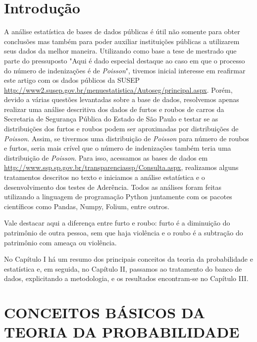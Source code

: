 \documentclass[
	12pt,
	openright,			%
	twoside,			%
	a4paper,			%
	chapter=TITLE,		%
	section=TITLE,		%
	subsection=TITLE,	%
	subsubsection=TITLE,%
	english,			%
	french,				%
	spanish,			%
	brazil				%
	]{abntex2}
\begin{document}
\chapter*[Introdução]{Introdução}
A análise estatística de bases de dados públicas é útil não somente para obter conclusões mas também para poder auxiliar instituições públicas a utilizarem seus dados da melhor maneira.
Utilizando como base a tese de mestrado \cite{ruina} que parte do pressuposto "Aqui é dado especial destaque ao caso em que o processo do número de indenizações é de \textit{Poisson}", tivemos inicial interesse em reafirmar este artigo com os dados públicos da SUSEP \url{http://www2.susep.gov.br/menuestatistica/Autoseg/principal.aspx}.
Porém, devido a várias questões levantadas sobre a base de dados, resolvemos apenas realizar uma análise descritiva dos dados de furtos e roubos de carros da Secretaria de Segurança Pública do Estado de São Paulo e testar se as distribuições dos furtos e roubos podem ser aproximadas por distribuições de \textit{Poisson}. Assim, se tivermos uma distribuição de \textit{Poisson} para número de roubos e furtos, seria mais crível que o número de indenizações também teria uma distribuição de \textit{Poisson}.
Para isso, acessamos as bases de dados em \url{http://www.ssp.sp.gov.br/transparenciassp/Consulta.aspx}, realizamos alguns tratamentos descritos no texto e iniciamos a análise estatística e o desenvolvimento dos testes de Aderência. Todos as análises foram feitas utilizando a linguagem de programação Python juntamente com os pacotes científicos como Pandas, Numpy, Folium, entre outros.

Vale destacar aqui a diferença entre furto e roubo: furto é a diminuição do patrimônio de outra pessoa, sem que haja violência e o roubo é a subtração do patrimônio com ameaça ou violência.

No Capítulo I há um resumo dos principais conceitos da teoria da probabilidade e estatística e, em seguida, no Capítulo II, passamos ao tratamento do banco de dados, explicitando a metodologia, e os resultados encontram-se no Capítulo III.

\chapter{CONCEITOS BÁSICOS DA TEORIA DA PROBABILIDADE}
\end{document}
